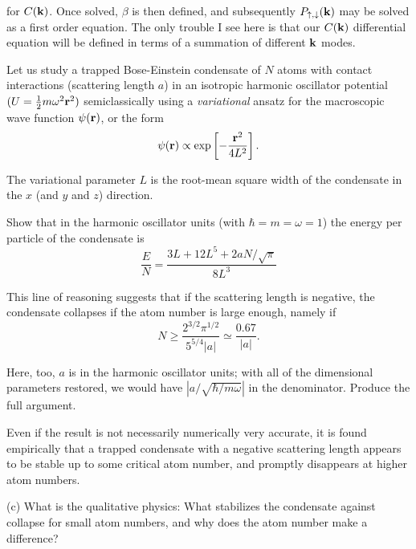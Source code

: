 \documentclass[10pt,letterpaper]{article}
\newcommand{\ve}{\textbf }
\begin{document}
for $C(\mathbf{k})$. Once solved, $\beta$ is then defined, and subsequently $P_{\uparrow,\downarrow}(\mathbf{k})$ may
be solved as a first order equation. The only trouble I see here is that our $C(\mathbf{k})$ differential equation
will be defined in terms of a summation of different $\mathbf{k}$ modes. 
\newpage
\eenum
\item Let us study a trapped Bose-Einstein condensate of $N$ atoms with contact interactions (scattering length $a$) in an isotropic harmonic oscillator potential $(U=\frac{1}{2} m\omega^2\ve r^2)$ semiclassically using a {\it variational} ansatz for the macroscopic wave function $\psi(\ve r)$, or the form
\[\psi(\ve r)\propto \exp\left[-\frac{\ve r^2}{4L^2}\right].\]

The variational parameter $L$ is the root-mean square width of the condensate in the $x$ (and $y$ and $z$) direction.

\benum

	\item Show that in the harmonic oscillator units (with $\hbar=m=\omega=1$) the energy per particle of the condensate is
	\[\frac{E}{N}=\frac{3L+12L^5+2aN/\sqrt{\pi}}{8L^3}\]
	
	\item This line of reasoning suggests that if the scattering length is negative, the condensate collapses if the atom number is large enough, namely if
	\[ N\geq\frac{2^{3/2}\pi^{1/2}}{5^{5/4}|a|}\simeq\frac{0.67}{|a|}.\]
	
	Here, too, $a$ is in the harmonic oscillator units; with all of the dimensional parameters restored, we would have $\left|a/\sqrt{\hbar/m\omega}\right|$ in the denominator. Produce the full argument.
	
\eenum
Even if the result is not necessarily numerically very accurate, it is found empirically that a trapped condensate with a negative scattering length appears to be stable up to some critical atom number, and promptly disappears at higher atom numbers.

\benum

	\item[(c)] What is the qualitative physics: What stabilizes the condensate against collapse for small atom numbers, and why does the atom number make a difference?\\ \\
\end{document}
